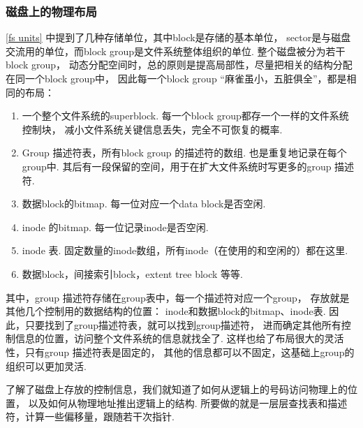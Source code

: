 \subsubsection{磁盘上的物理布局}
\ref{fs units} 中提到了几种存储单位，其中block是存储的基本单位，
sector是与磁盘交流用的单位，而block group是文件系统整体组织的单位.
整个磁盘被分为若干block group，
动态分配空间时，总的原则是提高局部性，尽量把相关的结构分配在同一个block group中，
因此每一个block group “麻雀虽小，五脏俱全”，都是相同的布局\cite{ext4high}：
\begin{enumerate}
	\item 一个整个文件系统的superblock. 
	      每一个block group都存一个一样的文件系统控制块，
	      减小文件系统关键信息丢失，完全不可恢复的概率.
	\item Group 描述符表，所有block group 的描述符的数组. 
	      也是重复地记录在每个group中.
	      其后有一段保留的空间，用于在扩大文件系统时写更多的group 描述符.
	\item 数据block的bitmap. 每一位对应一个data block是否空闲.
	\item inode 的bitmap. 每一位记录inode是否空闲.
	\item inode 表.
	      固定数量的inode数组，所有inode（在使用的和空闲的）都在这里.
	\item 数据block，间接索引block，extent tree block 等等.
\end{enumerate}
其中，group 描述符存储在group表中，每一个描述符对应一个group，
存放就是其他几个控制用的数据结构的位置：
inode和数据block的bitmap、inode表.
因此，只要找到了group描述符表，就可以找到group描述符，
进而确定其他所有控制信息的位置，访问整个文件系统的信息就找全了.
这样也给了布局很大的灵活性，只有group 描述符表是固定的，
其他的信息都可以不固定，这基础上group的组织可以更加灵活.\cite{ext4global}

了解了磁盘上存放的控制信息，我们就知道了如何从逻辑上的号码访问物理上的位置，
以及如何从物理地址推出逻辑上的结构.
所要做的就是一层层查找表和描述符，计算一些偏移量，跟随若干次指针.


